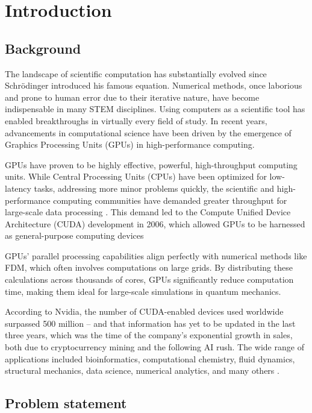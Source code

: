 \section{Introduction}

\subsection{Background}

The landscape of scientific computation has substantially evolved since Schrödinger introduced his famous equation. Numerical methods, once laborious and prone to human error due to their iterative nature, have become indispensable in many STEM disciplines. Using computers as a scientific tool has enabled breakthroughs in virtually every field of study. In recent years, advancements in computational science have been driven by the emergence of Graphics Processing Units (GPUs) in high-performance computing.

GPUs have proven to be highly effective, powerful, high-throughput computing units. While Central Processing Units (CPUs) have been optimized for low-latency tasks, addressing more minor problems quickly, the scientific and high-performance computing communities have demanded greater throughput for large-scale data processing \cite{cheng2014professional}. This demand led to the Compute Unified Device Architecture (CUDA) development in 2006, which allowed GPUs to be harnessed as general-purpose computing devices \cite{cuda}

GPUs' parallel processing capabilities align perfectly with numerical methods like FDM, which often involves computations on large grids. By distributing these calculations across thousands of cores, GPUs significantly reduce computation time, making them ideal for large-scale simulations in quantum mechanics.

According to Nvidia, the number of CUDA-enabled devices used worldwide surpassed 500 million -- and that information has yet to be updated in the last three years, which was the time of the company's exponential growth in sales, both due to cryptocurrency mining and the following AI rush. The wide range of applications included bioinformatics, computational chemistry, fluid dynamics, structural mechanics, data science, numerical analytics, and many others \cite{cuda}.

\subsection{Problem statement}

